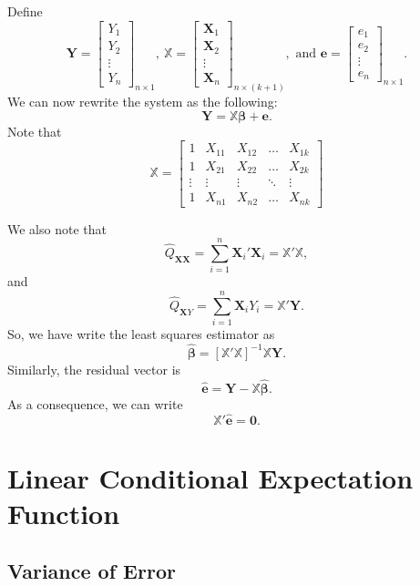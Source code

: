 \documentclass[
]{book}
\theoremstyle{definition}
\theoremstyle{definition}
\theoremstyle{definition}
\theoremstyle{definition}
\theoremstyle{remark}
\begin{document}
Define
\[
\pmb{Y}=\begin{bmatrix}
Y_1 \\
Y_2 \\
\vdots \\
Y_n
\end{bmatrix}_{n\times1},\ 
\mathbb{X}=\begin{bmatrix}
\pmb{X}_1 \\
\pmb{X}_2 \\
\vdots \\
\pmb{X}_n
\end{bmatrix}_{n\times(k+1)}, \mbox{ and }
\pmb{e}=\begin{bmatrix}
e_1 \\
e_2 \\
\vdots \\
e_n
\end{bmatrix}_{n\times1}.
\]
We can now rewrite the system as the following:
\[
\pmb{Y}=\mathbb{X}\pmb{\beta}+\pmb{e}.
\]
Note that
\[
\mathbb{X}=\begin{bmatrix}
1 & X_{11} & X_{12} & \ldots & X_{1k} \\
1 & X_{21} & X_{22} & \ldots & X_{2k} \\
\vdots & \vdots & \vdots & \ddots & \vdots \\
1 & X_{n1} & X_{n2} & \ldots & X_{nk}
\end{bmatrix}
\]

We also note that
\[
\widehat{Q}_{\pmb{XX}}=\sum\limits_{i=1}^n\pmb{X}_i'\pmb{X}_i=
\mathbb{X}'\mathbb{X},
\]
and
\[
\widehat{Q}_{\pmb{X}Y}=\sum\limits_{i=1}^n\pmb{X}_iY_i=
\mathbb{X}'\pmb{Y}.
\]
So, we have write the least squares estimator as
\[
\widehat{\pmb{\beta}}=\left[\mathbb{X}'\mathbb{X}\right]^{-1}\mathbb{X}\pmb{Y}.
\]
Similarly, the residual vector is
\[
\widehat{\pmb{e}}=\pmb{Y}-\mathbb{X}\widehat{\pmb{\beta}}.
\]
As a consequence, we can write
\[
\mathbb{X}'\widehat{\pmb{e}}=\pmb{0}.
\]

\hypertarget{linear-conditional-expectation-function}{%
\chapter{Linear Conditional Expectation Function}\label{linear-conditional-expectation-function}}

\hypertarget{variance-of-error}{%
\section{Variance of Error}\label{variance-of-error}}
\end{document}
